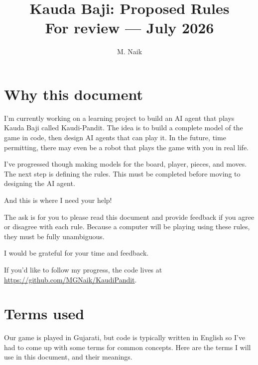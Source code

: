 \documentclass[10pt,a4paper]{article}
\title{\textbf{Kauda Baji: Proposed Rules}\\[2mm]
\large For review --- July 2026}
\author{M. Naik}
\date{}
\begin{document}
\maketitle

\section*{Why this document}

I'm currently working on a learning project to build an AI agent that plays Kauda Baji called Kaudi-Pandit.
The idea is to build a complete model of the game in code, then design AI agents that can play it.
In the future, time permitting, there may even be a robot that plays the game with you in real life.

I've progressed though making models for the board, player, pieces, and moves.
The next step is defining the rules. This must be completed before moving to designing the AI agent. 

And this is where I need your help!

The ask is for you to please read this document and provide feedback if you agree or disagree with each rule.
Because a computer will be playing using these rules, they must be fully unambiguous.

I would be grateful for your time and feedback.

If you'd like to follow my progress, the code lives at
\url{https://github.com/MGNaik/KaudiPandit}.

\section*{Terms used}

Our game is played in Gujarati, but code is typically written in English so I've had to come up with some terms for common concepts.
Here are the terms I will use in this document, and their meanings.
\end{document}
